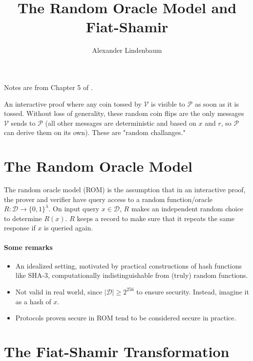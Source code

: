 \documentclass[11pt]{article}
\title{The Random Oracle Model and Fiat-Shamir}
\author{Alexander Lindenbaum}
\date{}
\newcommand{\verifier}{$\mathcal{V}$ }
\newcommand{\prover}{$\mathcal{P}$ }
\begin{document}
\maketitle

\paragraph*{} Notes are from Chapter 5 of \cite{tha22}.

\begin{definition} 
    An interactive proof where any coin tossed by \verifier is visible to \prover as soon as it is tossed. Without loss of generality, these random coin flips are the only messages \verifier sends to \prover (all other messages are deterministic and based on $x$ and $r$, so \prover can derive them on its own). These are "random challanges."
\end{definition}

\section{The Random Oracle Model}
\begin{definition}
    The random oracle model (ROM) is the assumption that in an interactive proof, the prover and verifier have query access to a random function/oracle $R: \mathcal{D} \rightarrow \{0, 1\}^\lambda$. On input query $x \in \mathcal{D}$, $R$ makes  an independent random choice to determine $R(x)$. $R$ keeps a record to make sure that it repeats the same response if $x$ is queried again.
\end{definition}

\paragraph*{Some remarks}
\begin{itemize}
    \item An idealized setting, motivated by practical constructions of hash functions like SHA-3, computationally indistinguishable from (truly) random functions.
    \item Not valid in real world, since $|\mathcal{D}| \geq 2^{256}$ to ensure security. Instead, imagine it as a hash of $x$.
    \item Protocols proven secure in ROM tend to be considered secure in practice.
\end{itemize}

\section{The Fiat-Shamir Transformation}
\end{document}
